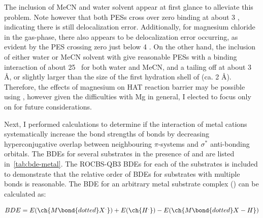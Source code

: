 The inclusion of MeCN and water solvent appear at first glance to alleviate
this problem. Note however that both PESs cross over zero binding at about 3
\kcalmol, indicating there is still delocalization error. Additionally, for
magnesium chloride in the gas-phase, there also appears to be delocalization
error occurring, as evident by the PES crossing zero just below 4 \kcalmol. On
the other hand, the inclusion of either water or MeCN solvent with 
give reasonable PESs with a binding interaction of about 25 \kcalmol\ for both
water and MeCN, and a tailing off at about 3 \AA, or slightly larger than the
size of the first hydration shell of  (ca. 2
\AA).\cite{Chatterjee2013} Therefore, the effects of magnesium on HAT reaction
barrier may be possible using , however given the difficulties with
Mg in general, I elected to focus only on  for future considerations.

Next, I performed calculations to determine if the interaction of metal cations
systematically increase the bond strengths of  bonds by decreasing
hyperconjugative overlap between neighbouring $\pi$-systems and 
$\sigma^*$ anti-bonding orbitals. The BDEs for several substrates in the
presence of  and  are listed in~\ref{tab:bde-metal}. The
ROCBS-QB3 BDEs for each of the substrates is included to demonstrate that the
relative order of BDEs for substrates with multiple  bonds is
reasonable. The BDE for an arbitrary metal substrate complex
() can be calculated as:

\begin{equation}
BDE = E(\ch{M\bond{dotted}X^.}) + E(\ch{H^.}) - E(\ch{M\bond{dotted}X-H})
\end{equation}

